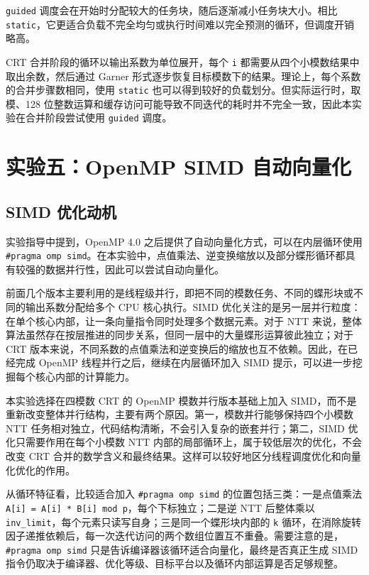 \documentclass[a4paper]{article}
\begin{document}
\texttt{guided} 调度会在开始时分配较大的任务块，随后逐渐减小任务块大小。相比 \texttt{static}，它更适合负载不完全均匀或执行时间难以完全预测的循环，但调度开销略高。

CRT 合并阶段的循环以输出系数为单位展开，每个 \texttt{i} 都需要从四个小模数结果中取出余数，然后通过 Garner 形式逐步恢复目标模数下的结果。理论上，每个系数的合并步骤数相同，使用 \texttt{static} 也可以得到较好的负载划分。但实际运行时，取模、128 位整数运算和缓存访问可能导致不同迭代的耗时并不完全一致，因此本实验在合并阶段尝试使用 \texttt{guided} 调度。


\section{实验五：OpenMP SIMD 自动向量化}

\subsection{SIMD 优化动机}

实验指导中提到，OpenMP 4.0 之后提供了自动向量化方式，可以在内层循环使用 \texttt{\#pragma omp simd}。在本实验中，点值乘法、逆变换缩放以及部分蝶形循环都具有较强的数据并行性，因此可以尝试自动向量化。

前面几个版本主要利用的是线程级并行，即把不同的模数任务、不同的蝶形块或不同的输出系数分配给多个 CPU 核心执行。SIMD 优化关注的是另一层并行粒度：在单个核心内部，让一条向量指令同时处理多个数据元素。对于 NTT 来说，整体算法虽然存在按层推进的同步关系，但同一层中的大量蝶形运算彼此独立；对于 CRT 版本来说，不同系数的点值乘法和逆变换后的缩放也互不依赖。因此，在已经完成 OpenMP 线程并行之后，继续在内层循环加入 SIMD 提示，可以进一步挖掘每个核心内部的计算能力。

本实验选择在四模数 CRT 的 OpenMP 模数并行版本基础上加入 SIMD，而不是重新改变整体并行结构，主要有两个原因。第一，模数并行能够保持四个小模数 NTT 任务相对独立，代码结构清晰，不会引入复杂的嵌套并行；第二，SIMD 优化只需要作用在每个小模数 NTT 内部的局部循环上，属于较低层次的优化，不会改变 CRT 合并的数学含义和最终结果。这样可以较好地区分线程调度优化和向量化优化的作用。

从循环特征看，比较适合加入 \texttt{\#pragma omp simd} 的位置包括三类：一是点值乘法 \texttt{A[i] = A[i] * B[i] mod p}，每个下标独立；二是逆 NTT 后整体乘以 \texttt{inv\_limit}，每个元素只读写自身；三是同一个蝶形块内部的 \texttt{k} 循环，在消除旋转因子递推依赖后，每一次迭代访问的两个数组位置互不重叠。需要注意的是，\texttt{\#pragma omp simd} 只是告诉编译器该循环适合向量化，最终是否真正生成 SIMD 指令仍取决于编译器、优化等级、目标平台以及循环内部运算是否足够规整。
\end{document}
